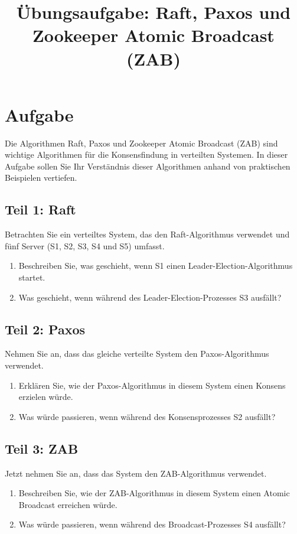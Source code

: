\documentclass{article}
\begin{document}
\title{Übungsaufgabe: Raft, Paxos und Zookeeper Atomic Broadcast (ZAB)}
\maketitle

\section*{Aufgabe}

Die Algorithmen Raft, Paxos und Zookeeper Atomic Broadcast (ZAB) sind wichtige Algorithmen für die Konsensfindung in verteilten Systemen. In dieser Aufgabe sollen Sie Ihr Verständnis dieser Algorithmen anhand von praktischen Beispielen vertiefen.

\subsection*{Teil 1: Raft}

Betrachten Sie ein verteiltes System, das den Raft-Algorithmus verwendet und fünf Server (S1, S2, S3, S4 und S5) umfasst.

\begin{enumerate}
\item Beschreiben Sie, was geschieht, wenn S1 einen Leader-Election-Algorithmus startet.
\item Was geschieht, wenn während des Leader-Election-Prozesses S3 ausfällt?
\end{enumerate}

\subsection*{Teil 2: Paxos}

Nehmen Sie an, dass das gleiche verteilte System den Paxos-Algorithmus verwendet.

\begin{enumerate}
\item Erklären Sie, wie der Paxos-Algorithmus in diesem System einen Konsens erzielen würde.
\item Was würde passieren, wenn während des Konsensprozesses S2 ausfällt?
\end{enumerate}

\subsection*{Teil 3: ZAB}

Jetzt nehmen Sie an, dass das System den ZAB-Algorithmus verwendet.

\begin{enumerate}
\item Beschreiben Sie, wie der ZAB-Algorithmus in diesem System einen Atomic Broadcast erreichen würde.
\item Was würde passieren, wenn während des Broadcast-Prozesses S4 ausfällt?
\end{enumerate}
\end{document}
